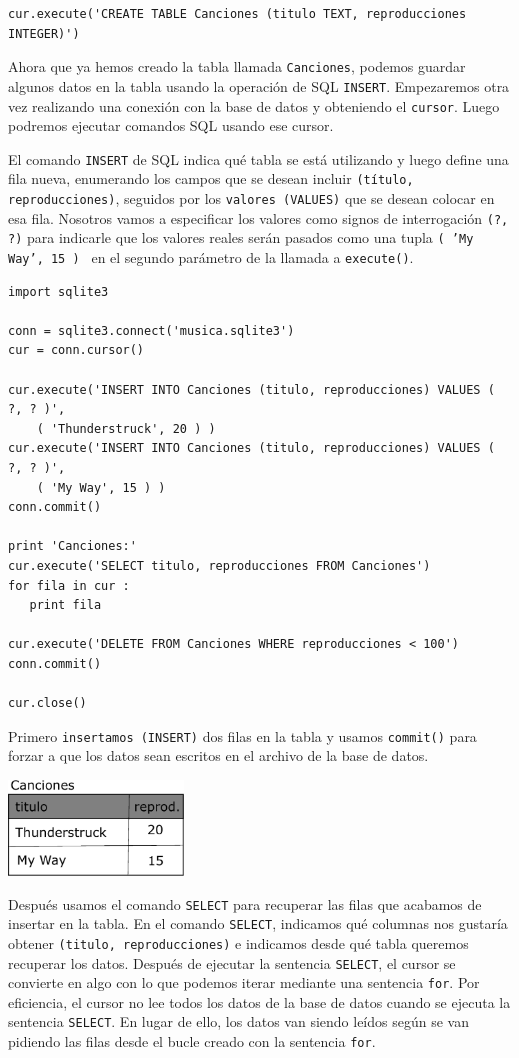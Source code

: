\beforeverb
\begin{verbatim}
cur.execute('CREATE TABLE Canciones (titulo TEXT, reproducciones INTEGER)')
\end{verbatim}
\afterverb
%
Ahora que ya hemos creado la tabla llamada {\tt Canciones}, podemos guardar
algunos datos en la tabla usando la operación de SQL {\tt INSERT}. Empezaremos otra vez
realizando una conexión con la base de datos y obteniendo el {\tt cursor}.
Luego podremos ejecutar comandos SQL usando ese cursor.

El comando {\tt INSERT} de SQL indica qué tabla se está utilizando
y luego define una fila nueva, enumerando los campos que se desean
incluir {\tt (título, reproducciones)}, seguidos por los {\tt valores (VALUES)} que
se desean colocar en esa fila. Nosotros vamos a especificar los valores como signos de interrogación
{\tt (?, ?)} para indicarle que los valores reales serán pasados como una
tupla {\tt ( 'My Way', 15 ) } en el segundo parámetro de la
llamada a {\tt execute()}.

\beforeverb
\begin{verbatim}
import sqlite3

conn = sqlite3.connect('musica.sqlite3')
cur = conn.cursor()

cur.execute('INSERT INTO Canciones (titulo, reproducciones) VALUES ( ?, ? )', 
    ( 'Thunderstruck', 20 ) )
cur.execute('INSERT INTO Canciones (titulo, reproducciones) VALUES ( ?, ? )', 
    ( 'My Way', 15 ) )
conn.commit()

print 'Canciones:'
cur.execute('SELECT titulo, reproducciones FROM Canciones')
for fila in cur :
   print fila

cur.execute('DELETE FROM Canciones WHERE reproducciones < 100')
conn.commit()

cur.close()
\end{verbatim}
\afterverb
%
Primero {\tt insertamos (INSERT)} dos filas en la tabla y usamos {\tt commit()}
para forzar a que los datos sean escritos en el archivo de la base de datos.

\beforefig
\centerline{\includegraphics[height=1.00in]{figs2/tracks.eps}}
\afterfig

Después usamos el comando {\tt SELECT} para
recuperar las filas que acabamos de insertar en la tabla.
En el comando
{\tt SELECT}, indicamos qué columnas nos gustaría obtener {\tt (titulo, reproducciones)}
e indicamos desde qué tabla queremos recuperar los datos. Después de
ejecutar la sentencia {\tt SELECT}, el cursor se convierte en algo con lo que podemos
iterar mediante una sentencia {\tt for}. Por eficiencia,
el cursor no lee todos los datos de la base de datos
cuando se ejecuta la sentencia {\tt SELECT}.
En lugar de ello, los datos van siendo leídos según
se van pidiendo las filas desde el bucle creado con la sentencia {\tt for}.

